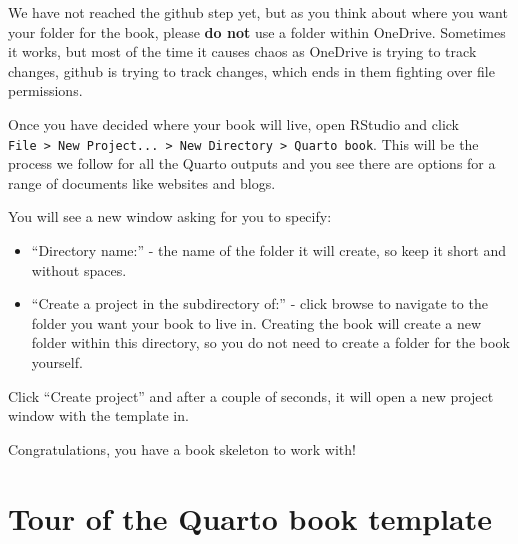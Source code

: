 \documentclass[
  letterpaper,
  DIV=11,
  numbers=noendperiod]{scrreprt}
\begin{document}
\begin{tcolorbox}[enhanced jigsaw, colbacktitle=quarto-callout-warning-color!10!white, titlerule=0mm, leftrule=.75mm, title=\textcolor{quarto-callout-warning-color}{\faExclamationTriangle}\hspace{0.5em}{Do not create github repositories within OneDrive}, breakable, bottomrule=.15mm, opacitybacktitle=0.6, rightrule=.15mm, opacityback=0, arc=.35mm, colframe=quarto-callout-warning-color-frame, toptitle=1mm, bottomtitle=1mm, toprule=.15mm, left=2mm, colback=white, coltitle=black]

We have not reached the github step yet, but as you think about where
you want your folder for the book, please \textbf{do not} use a folder
within OneDrive. Sometimes it works, but most of the time it causes
chaos as OneDrive is trying to track changes, github is trying to track
changes, which ends in them fighting over file permissions.

\end{tcolorbox}

Once you have decided where your book will live, open RStudio and click
\texttt{File\ \textgreater{}\ New\ Project...\ \textgreater{}\ New\ Directory\ \textgreater{}\ Quarto\ book}.
This will be the process we follow for all the Quarto outputs and you
see there are options for a range of documents like websites and blogs.

You will see a new window asking for you to specify:

\begin{itemize}
\item
  ``Directory name:'' - the name of the folder it will create, so keep
  it short and without spaces.
\item
  ``Create a project in the subdirectory of:'' - click browse to
  navigate to the folder you want your book to live in. Creating the
  book will create a new folder within this directory, so you do not
  need to create a folder for the book yourself.
\end{itemize}

Click ``Create project'' and after a couple of seconds, it will open a
new project window with the template in.

Congratulations, you have a book skeleton to work with!

\section{Tour of the Quarto book
template}\label{tour-of-the-quarto-book-template}
\end{document}
